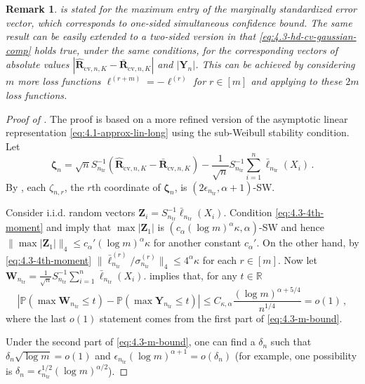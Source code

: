 \documentclass[11pt]{article}
\theoremstyle{plain}
\newtheorem{remark}[theorem]{Remark}
\newcommand{\cv}{{\mathrm{cv}}}
\newcommand{\tr}{{\mathrm{tr}}}
\begin{document}
\begin{remark}
    \label{rem:4.3-sign-flip}
     is stated for the maximum entry of the marginally standardized error vector, which corresponds to one-sided simultaneous confidence bound.  The same result can be easily extended to a two-sided version in that \eqref{eq:4.3-hd-cv-gaussian-comp} holds true, under the same conditions, for the corresponding vectors of absolute values $|\hat{\mathbf R}_{\cv,n,K}-\bar{\mathbf R}_{\cv,n,K}|$ and $|\mathbf Y_n|$. This can be achieved by considering $m$ more loss functions $\ell^{(r+m)}=-\ell^{(r)}$ for $r\in[m]$ and applying  to these $2m$ loss functions.
\end{remark}

\begin{proof}
    [Proof of ]
    
The proof is based on a more refined version of the asymptotic linear representation \eqref{eq:4.1-approx-lin-long} using the sub-Weibull stability condition.
Let 
$$\boldsymbol{\zeta}_n=\sqrt{n}S_{n_\tr}^{-1}(\hat{\mathbf R}_{\cv,n,K}-\bar{\mathbf R}_{\cv,n,K}) - \frac{1}{\sqrt{n}}S_{n_\tr}^{-1}\sum_{i=1}^n \bar{\boldsymbol{\ell}}_{n_\tr}(X_i)\,.$$
By , each $\zeta_{n,r}$, the $r$th coordinate of $\boldsymbol{\zeta}_n$, is $(2\epsilon_{n_\tr},\alpha+1)$-SW.

Consider i.i.d. random vectors $\mathbf Z_i = S_{n_\tr}^{-1}\bar{\boldsymbol{\ell}}_{n_\tr}(X_i)$. Condition \eqref{eq:4.3-4th-moment}
and  imply that $\max |\mathbf Z_1|$ is $(c_\alpha (\log m)^\alpha\kappa,\alpha)$-SW and hence
$\|\max |\mathbf Z_1|\|_4 \le c_\alpha'(\log m)^\alpha\kappa$ for another constant $c_\alpha'$.  On the other hand, by \eqref{eq:4.3-4th-moment} $\|\bar\ell_{n_\tr}^{(r)}/\sigma_{n_\tr}^{(r)}\|_4\le 4^\alpha\kappa$ for each $r\in[m]$.
Now let $\mathbf W_{n_\tr}=\frac{1}{\sqrt{n}}S_{n_\tr}^{-1}\sum_{i=1}^n\bar{\boldsymbol{\ell}}_{n_\tr}(X_i)$.  implies that, for any $t\in\mathbb R$
\begin{equation}
    \label{eq:4.3-cckk-bar-ell}
    |\mathbb P(\max \mathbf W_{n_\tr}\le t)-\mathbb P(\max\mathbf Y_{n_\tr}\le t)|\le C_{\kappa,\alpha}\frac{(\log m)^{\alpha+5/4}}{n^{1/4}}=o(1)\,,
\end{equation}
where the last $o(1)$ statement comes from the first part of \eqref{eq:4.3-m-bound}.

Under the second part of \eqref{eq:4.3-m-bound}, one can find a $\delta_n$ such that $\delta_n\sqrt{\log m}=o(1)$ and $\epsilon_{n_\tr}(\log m)^{\alpha+1}=o(\delta_n)$ (for example, one possibility is  $\delta_n=\epsilon_{n_\tr}^{1/2}(\log m)^{\alpha/2}$).


\end{proof}
\end{document}
